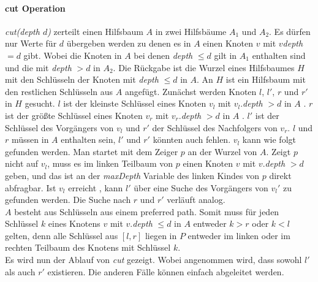 \documentclass[a4paper,12pt]{article}
\begin{document}
\paragraph{cut Operation} \label{cut}

\noindent \textit{cut(depth $d$)} zerteilt einen Hilfsbaum $A$ in zwei Hilfsbäume $A_1$ und $A_2$. Es dürfen nur Werte für $d$ übergeben werden zu denen es in $A$ einen Knoten $v$ mit $v$\textit{depth} $ = d $ gibt. Wobei die Knoten in $A$ bei denen \textit{depth} $\leq d$ gilt in $A_1$ enthalten sind und die mit \textit{depth} $ > d$ in $A_2$. Die Rückgabe ist die Wurzel eines Hilfsbaumes $H$ mit den Schlüsseln der Knoten mit \textit{depth} $\leq d$ in $A$. An $H$ ist ein Hilfsbaum mit den restlichen Schlüsseln aus $A$ angefügt. Zunächst werden Knoten $l$,  $l'$, $r$ und $r'$ in $H$ gesucht. $l$ ist der kleinste Schlüssel eines Knoten $v_l$ mit $v_l$.\textit{depth} $> d$  in $A$ . $r$ ist der größte Schlüssel eines Knoten $v_r$ mit $v_r$.\textit{depth} $> d$  in $A$  . $l'$ ist der Schlüssel des Vorgängers von $v_l$ und $r'$ der Schlüssel des Nachfolgers von $v_r$. $l$ und $r$ müssen in $A$ enthalten sein, $l'$ und $r'$ könnten auch fehlen. $v_l$ kann wie folgt gefunden werden. Man startet mit dem Zeiger $p$ an der Wurzel von $A$. Zeigt $p$ nicht auf $v_l$, muss es im linken Teilbaum von $p$ einen Knoten $v$ mit $v$.\textit{depth} $> d$ geben, und das ist an der \textit{maxDepth} Variable des linken Kindes von $p$ direkt abfragbar. Ist $v_l$ erreicht , kann $l'$ über eine Suche des Vorgängers von $v_l'$ zu gefunden werden. Die Suche nach $r$ und $r'$ verläuft analog. \\
$A$ besteht aus Schlüsseln aus einem preferred path. Somit muss für jeden Schlüssel $k$ eines Knotens $v$ mit $v$.\textit{depth} $\leq d$ in $A$ entweder $k > r$ oder $k < l$ gelten, denn alle Schlüssel aus $\left[l,r\right]$ liegen in $P$ entweder im linken oder im rechten Teilbaum des Knotens mit Schlüssel $k$. \\
Es wird nun der Ablauf von \textit{cut} gezeigt. Wobei angenommen wird, dass sowohl $l'$ als auch $r'$ existieren. Die anderen Fälle können einfach abgeleitet werden.
\end{document}
